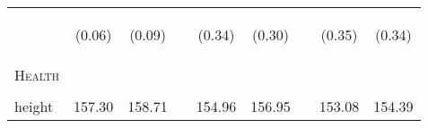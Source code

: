 \documentclass{article}[11pt,subeqn]
\begin{document}
\begin{spacing}{1.5}
\begin{table}[ht]
\begin{center}
\begin{tabular}{lccp{5mm}ccp{5mm}cc}
\begin{footnotesize}\end{footnotesize}	& \begin{footnotesize} (0.06)\end{footnotesize} & \begin{footnotesize} (0.09)\end{footnotesize} & \begin{footnotesize} 	\end{footnotesize} & \begin{footnotesize} (0.34)\end{footnotesize} & \begin{footnotesize} (0.30)\end{footnotesize} & \begin{footnotesize} 	\end{footnotesize} & \begin{footnotesize} (0.35)\end{footnotesize} & \begin{footnotesize} (0.34)\end{footnotesize}	\\
\textsc{Health} & & &&&&&& \\															
\begin{footnotesize}\end{footnotesize}	&	\begin{footnotesize}\end{footnotesize}	&	\begin{footnotesize}\end{footnotesize}	&	\begin{footnotesize}\end{footnotesize} &	\begin{footnotesize}\end{footnotesize}	&	\begin{footnotesize}\end{footnotesize}	&	\begin{footnotesize}\end{footnotesize} &	\begin{footnotesize}\end{footnotesize}	&	\begin{footnotesize}\end{footnotesize}		\\
height	&	157.30	&	158.71	&	&	154.96	&	156.95	&	&	153.08	&	154.39		\\

\end{tabular}
\end{center}
\end{table}
\end{spacing}
\end{document}
